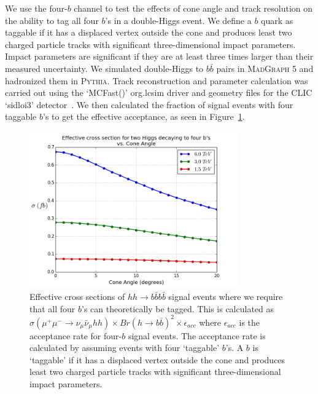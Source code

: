 \documentclass[12pt]{article}
\begin{document}
We use the four-$b$ channel to test the effects of cone angle and track resolution on the ability to tag all four $b$'s in a double-Higgs event. We define a $b$ quark as taggable if it has a displaced vertex outside the cone and produces least two charged particle tracks with significant three-dimensional impact parameters. Impact parameters are significant if they are at least three times larger than their measured uncertainty. We simulated double-Higgs to $b\bar{b}$ pairs in \textsc{MadGraph 5} and hadronized them in \textsc{Pythia}. Track reconstruction and parameter calculation was carried out using the `MCFast()' org.lcsim driver and geometry files for the CLIC `sidloi3' detector~\cite{sidloi3}. We then calculated the fraction of signal events with four taggable $b$'s to get the effective acceptance, as seen in Figure~\ref{fig:cone-xsects}.

\begin{figure}
	\centering
	\includegraphics[width=0.8\textwidth]{cone_xsects}
	\caption{Effective cross sections of $hh\rightarrow b\bar{b}b\bar{b}$ signal events where we require that all four $b$'s can theoretically be tagged. This is calculated as $\sigma(\mu^+\mu^-\rightarrow \nu_\mu \bar{\nu}_\mu h h) \times Br{(h\rightarrow b\bar{b})}^2 \times \epsilon_{acc}$ where $\epsilon_{acc}$ is the acceptance rate for four-$b$ signal events. The acceptance rate is calculated by assuming events with four `taggable' $b$'s. A $b$ is `taggable' if it has a displaced vertex outside the cone and produces least two charged particle tracks with significant three-dimensional impact parameters.}\label{fig:cone-xsects}
\end{figure}

\end{document}
